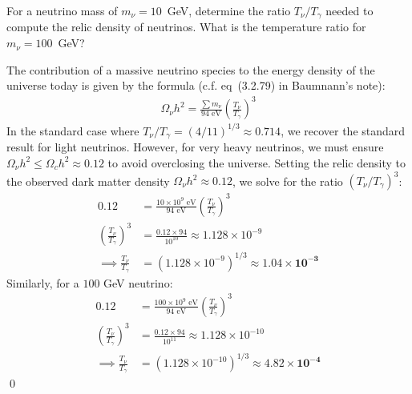 \clearpage
{}
For a neutrino mass of $m_\nu=10$~GeV, determine the ratio $T_\nu/T_\gamma$ needed to compute
the relic density of neutrinos. What is the temperature ratio for $m_\nu=100$~GeV?
\answer{}

The contribution of a massive neutrino species to the energy density of the universe today is given by the formula (c.f. eq~(3.2.79) in Baumnann's note):
\begin{align}
\Omega_\nu h^2 = \frac{\sum m_\nu}{94 \text{ eV}} \left( \frac{T_\nu}{T_\gamma} \right)^3
\end{align}
In the standard case where $T_\nu/T_\gamma = (4/11)^{1/3} \approx 0.714$, we recover the standard result for light neutrinos. However, for very heavy neutrinos, we must ensure $\Omega_\nu h^2 \leq \Omega_c h^2 \approx 0.12$ to avoid overclosing the universe. Setting the relic density to the observed dark matter density $\Omega_\nu h^2 \approx 0.12$, we solve for the ratio $(T_\nu/T_\gamma)^3$:
\begin{align}0.12 &= \frac{10 \times 10^9 \text{ eV}}{94 \text{ eV}} \left( \frac{T_\nu}{T_\gamma} \right)^3 \\
    \left( \frac{T_\nu}{T_\gamma} \right)^3 &= \frac{0.12 \times 94}{10^{10}} \approx 1.128 \times 10^{-9} \\
    \implies \frac{T_\nu}{T_\gamma} &= (1.128 \times 10^{-9})^{1/3} \approx \mathbf{1.04 \times 10^{-3}}
\end{align}
Similarly, for a $100$ GeV neutrino:\begin{align}0.12 &= \frac{100 \times 10^9 \text{ eV}}{94 \text{ eV}} \left( \frac{T_\nu}{T_\gamma} \right)^3 \\
    \left( \frac{T_\nu}{T_\gamma} \right)^3 &= \frac{0.12 \times 94}{10^{11}} \approx 1.128 \times 10^{-10} \\
    \implies \frac{T_\nu}{T_\gamma} &= (1.128 \times 10^{-10})^{1/3} \approx \mathbf{4.82 \times 10^{-4}}
\end{align}
\qed